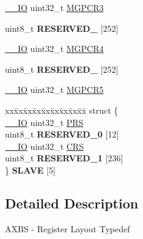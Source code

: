 \begin{DoxyCompactItemize}
\item 
\hyperlink{core__sc300_8h_aec43007d9998a0a0e01faede4133d6be}{\+\_\+\+\_\+\+IO} uint32\+\_\+t \hyperlink{structAXBS__Type_ae9e660e16d928563b9b2e58f46983504}{M\+G\+P\+C\+R3}
\item 
uint8\+\_\+t {\bfseries R\+E\+S\+E\+R\+V\+E\+D\+\_} \mbox{[}252\mbox{]}\hypertarget{structAXBS__Type_ac48e201340758fab38e3b8d604f01d49}{}\label{structAXBS__Type_ac48e201340758fab38e3b8d604f01d49}

\item 
\hyperlink{core__sc300_8h_aec43007d9998a0a0e01faede4133d6be}{\+\_\+\+\_\+\+IO} uint32\+\_\+t \hyperlink{structAXBS__Type_aaa542cd213d68e28cb53b109ad72d3f8}{M\+G\+P\+C\+R4}
\item 
uint8\+\_\+t {\bfseries R\+E\+S\+E\+R\+V\+E\+D\+\_} \mbox{[}252\mbox{]}\hypertarget{structAXBS__Type_afaf7bc4a69b948f5e36c4e5f72434b04}{}\label{structAXBS__Type_afaf7bc4a69b948f5e36c4e5f72434b04}

\item 
\hyperlink{core__sc300_8h_aec43007d9998a0a0e01faede4133d6be}{\+\_\+\+\_\+\+IO} uint32\+\_\+t \hyperlink{structAXBS__Type_a2b43d3f715876c1d8a5297f9f401df13}{M\+G\+P\+C\+R5}
\item 
\begin{tabbing}
xx\=xx\=xx\=xx\=xx\=xx\=xx\=xx\=xx\=\kill
struct \{\\
\>\hyperlink{core__sc300_8h_aec43007d9998a0a0e01faede4133d6be}{\_\_IO} uint32\_t \hyperlink{structAXBS__Type_a5fcaf70cb286f5b3bb78e2ba616586c1}{PRS}\\
\>uint8\_t {\bfseries RESERVED\_0} \mbox{[}12\mbox{]}\\
\>\hyperlink{core__sc300_8h_aec43007d9998a0a0e01faede4133d6be}{\_\_IO} uint32\_t \hyperlink{structAXBS__Type_a903f1ae9006bf6e28d76a210abcb5453}{CRS}\\
\>uint8\_t {\bfseries RESERVED\_1} \mbox{[}236\mbox{]}\\
\} {\bfseries SLAVE} \mbox{[}5\mbox{]}\hypertarget{structAXBS__Type_a3390d7e4c3dafe490c40db76e1377d24}{}\label{structAXBS__Type_a3390d7e4c3dafe490c40db76e1377d24}
\\

\end{tabbing}\end{DoxyCompactItemize}


\subsection{Detailed Description}
A\+X\+BS -\/ Register Layout Typedef 


